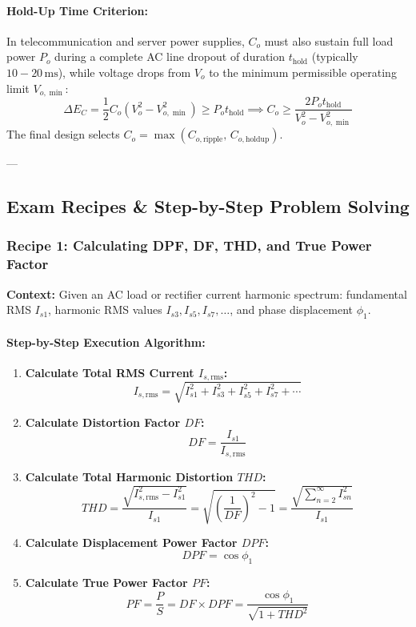 \paragraph{Hold-Up Time Criterion:}
In telecommunication and server power supplies, $C_o$ must also sustain full load power $P_o$ during a complete AC line dropout of duration $t_{\mathrm{hold}}$ (typically $10 - 20\,\si{\milli\second}$), while voltage drops from $V_o$ to the minimum permissible operating limit $V_{o,\min}$:
\begin{equation}
\Delta E_C = \frac{1}{2} C_o \left(V_o^2 - V_{o,\min}^2\right) \ge P_o t_{\mathrm{hold}} \implies C_o \ge \frac{2 P_o t_{\mathrm{hold}}}{V_o^2 - V_{o,\min}^2}
\end{equation}
The final design selects $C_o = \max\left(C_{o,\mathrm{ripple}},\, C_{o,\mathrm{holdup}}\right)$.

---

\subsection{Exam Recipes \& Step-by-Step Problem Solving}

\subsubsection{Recipe 1: Calculating DPF, DF, THD, and True Power Factor}
\noindent\textbf{Context:} Given an AC load or rectifier current harmonic spectrum: fundamental RMS $I_{s1}$, harmonic RMS values $I_{s3}, I_{s5}, I_{s7}, \dots$, and phase displacement $\phi_1$.

\paragraph{Step-by-Step Execution Algorithm:}
\begin{enumerate}
  \item \textbf{Calculate Total RMS Current $I_{s,\mathrm{rms}}$:}
  \[
  I_{s,\mathrm{rms}} = \sqrt{I_{s1}^2 + I_{s3}^2 + I_{s5}^2 + I_{s7}^2 + \cdots}
  \]
  \item \textbf{Calculate Distortion Factor $DF$:}
  \[
  DF = \frac{I_{s1}}{I_{s,\mathrm{rms}}}
  \]
  \item \textbf{Calculate Total Harmonic Distortion $THD$:}
  \[
  THD = \frac{\sqrt{I_{s,\mathrm{rms}}^2 - I_{s1}^2}}{I_{s1}} = \sqrt{\left(\frac{1}{DF}\right)^2 - 1} = \frac{\sqrt{\sum_{n=2}^\infty I_{sn}^2}}{I_{s1}}
  \]
  \item \textbf{Calculate Displacement Power Factor $DPF$:}
  \[
  DPF = \cos\phi_1
  \]
  \item \textbf{Calculate True Power Factor $PF$:}
  \[
  PF = \frac{P}{S} = DF \times DPF = \frac{\cos\phi_1}{\sqrt{1 + THD^2}}
  \]
\end{enumerate}

